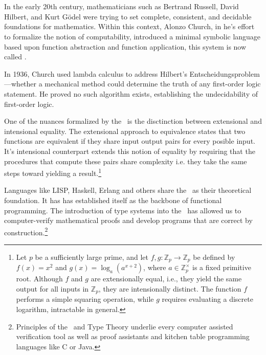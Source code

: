 \documentclass[12pt]{book}
\begin{document}

\chapter{\lCalc}

In the early 20th century, mathematicians such as Bertrand Russell, David Hilbert, and Kurt Gödel were trying to set complete, consistent, and decidable foundations for mathematics. Within this context, Alonzo Church, in he's effort to formalize the notion of  computability, introduced a minimal symbolic language based upon function abstraction and function application, this system is now called \lcalc.

In 1936, Church used lambda calculus to address Hilbert’s Entscheidungsproblem—whether a mechanical method could determine the truth of any first-order logic statement. He proved no such algorithm exists, establishing the undecidability of first-order logic.

One of the nuances formalized by the \lcalc \ is the disctinction between extensional and intensional equality. The extensional approach to equivalence states that two functions are equivalent if they share input output pairs for every posible input. It's intensional counterpart extends this notion of equality by requiring that the procedures that compute these pairs share complexity i.e. they take the same steps toward yielding a result.\footnote{
  Let \( p \) be a sufficiently large prime, and let \( f, g : \mathbb{Z}_p \to \mathbb{Z}_p \) be defined by \( f(x) = x^2 \) and \( g(x) = \log_a(a^{x+2}) \), where \( a \in \mathbb{Z}_p^\times \) is a fixed primitive root. Although \( f \) and \( g \) are extensionally equal, i.e., they yield the same output for all inputs in \( \mathbb{Z}_p \), they are intensionally distinct. The function \( f \) performs a simple squaring operation, while \( g \) requires evaluating a discrete logarithm, intractable in general. 
}

Languages like LISP, Haskell, Erlang and others share the \lcalc \ as their theoretical foundation. It has has established itself as the backbone of functional programming. The introduction of type systems into the \lcalc \ has allowed us to computer-verify mathematical proofs and develop programs that are correct by construction.\footnote{Principles of the \lcalc \ and Type Theory underlie every computer assisted verification tool as well as proof assistants and kitchen table programming languages like C or Java.}
\end{document}
